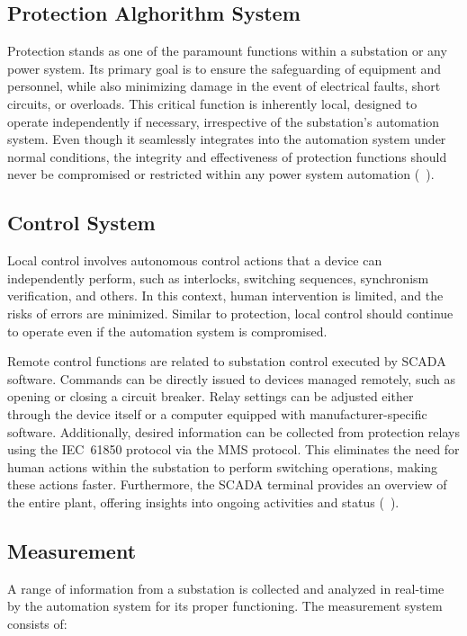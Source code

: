 \subsection{Protection Alghorithm System}
Protection stands as one of the paramount functions within a substation or any power system. Its primary goal is to ensure the safeguarding of equipment and personnel, while also minimizing damage in the event of electrical faults, short circuits, or overloads. This critical function is inherently local, designed to operate independently if necessary, irrespective of the substation's automation system. Even though it seamlessly integrates into the automation system under normal conditions, the integrity and effectiveness of protection functions should never be compromised or restricted within any power system automation (~\cite{NormaIEC61850}).

\subsection{Control System}
Local control involves autonomous control actions that a device can independently perform, such as interlocks, switching sequences, synchronism verification, and others. In this context, human intervention is limited, and the risks of errors are minimized. Similar to protection, local control should continue to operate even if the automation system is compromised.

Remote control functions are related to substation control executed by SCADA software. Commands can be directly issued to devices managed remotely, such as opening or closing a circuit breaker. Relay settings can be adjusted either through the device itself or a computer equipped with manufacturer-specific software. Additionally, desired information can be collected from protection relays using the IEC~61850 protocol via the MMS protocol. This eliminates the need for human actions within the substation to perform switching operations, making these actions faster. Furthermore, the SCADA terminal provides an overview of the entire plant, offering insights into ongoing activities and status (~\cite{NormaIEC61850}).

\subsection{Measurement}

A range of information from a substation is collected and analyzed in real-time by the automation system for its proper functioning. The measurement system consists of:

